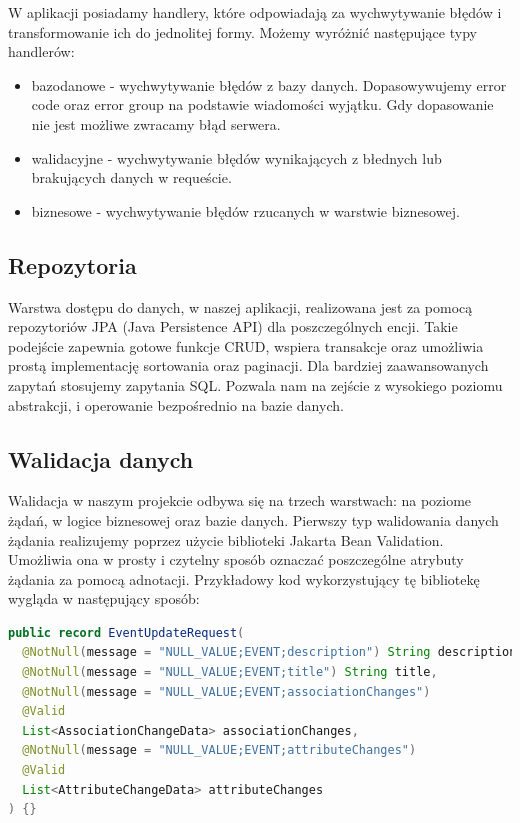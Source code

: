 W aplikacji posiadamy handlery, które odpowiadają za wychwytywanie błędów i transformowanie ich do jednolitej formy.
Możemy wyróżnić następujące typy handlerów:
\begin{itemize}
    \item bazodanowe - wychwytywanie błędów z bazy danych. Dopasowywujemy error code oraz error group na podstawie wiadomości wyjątku. Gdy dopasowanie nie
    jest możliwe zwracamy błąd serwera.
    \item walidacyjne - wychwytywanie błędów wynikających z błednych lub brakujących danych w requeście.
    \item biznesowe - wychwytywanie błędów rzucanych w warstwie biznesowej.
\end{itemize}

\subsection{Repozytoria}

Warstwa dostępu do danych, w naszej aplikacji, realizowana jest za pomocą repozytoriów JPA (Java Persistence API) dla poszczególnych encji. 
Takie podejście zapewnia gotowe funkcje CRUD, wspiera transakcje oraz umożliwia prostą implementację sortowania oraz paginacji.
Dla bardziej zaawansowanych zapytań stosujemy zapytania SQL. Pozwala nam na zejście z wysokiego poziomu abstrakcji, i operowanie
bezpośrednio na bazie danych.

\subsection{Walidacja danych}

Walidacja w naszym projekcie odbywa się na trzech warstwach: na poziome żądań, w logice biznesowej oraz bazie danych.
Pierwszy typ walidowania danych żądania realizujemy poprzez użycie biblioteki Jakarta Bean Validation. Umożliwia ona w prosty
i czytelny sposób oznaczać poszczególne atrybuty żądania za pomocą adnotacji. Przykładowy kod wykorzystujący tę bibliotekę
wygląda w następujący sposób:

\begin{lstlisting}[language=Java]
public record EventUpdateRequest(
  @NotNull(message = "NULL_VALUE;EVENT;description") String description,
  @NotNull(message = "NULL_VALUE;EVENT;title") String title,
  @NotNull(message = "NULL_VALUE;EVENT;associationChanges")
  @Valid
  List<AssociationChangeData> associationChanges,
  @NotNull(message = "NULL_VALUE;EVENT;attributeChanges")
  @Valid
  List<AttributeChangeData> attributeChanges
) {}
\end{lstlisting}

